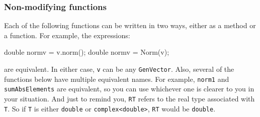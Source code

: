 \documentclass[twoside,letterpaper,11pt]{article}
\renewcommand{\tt}[1]{{\lstinline {#1}}}
\begin{document}
\subsubsection{Non-modifying functions}

Each of the following functions can be written in two ways, either as a method or a function.
For example, the expressions:
\begin{tmvcode}
double normv = v.norm();
double normv = Norm(v);
\end{tmvcode}
are equivalent.  In either case, \tt{v} can be any \tt{GenVector}.
Also, several of the functions below have multiple equivalent names.  For example,
\tt{norm1} and \tt{sumAbsElements} are equivalent, so you can use whichever one is
clearer to you in your situation.  And just to remind you, \tt{RT} refers to the 
real type associated with \tt{T}.  So if \tt{T} is either \tt{double} or \tt{complex<double>},
\tt{RT} would be \tt{double}.
\end{document}
